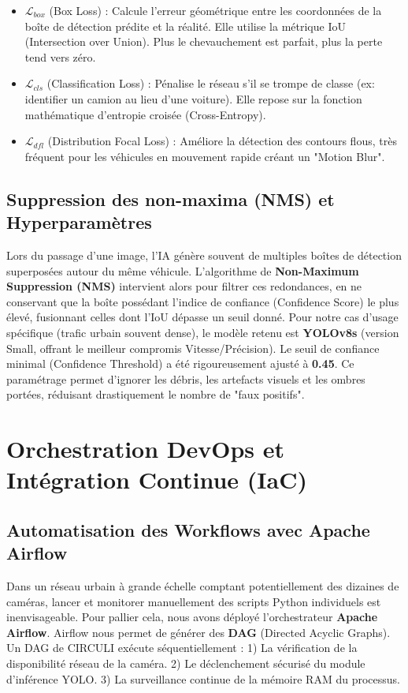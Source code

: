 \begin{itemize}
    \item \textbf{$\mathcal{L}_{box}$} (Box Loss) : Calcule l'erreur géométrique entre les coordonnées de la boîte de détection prédite et la réalité. Elle utilise la métrique IoU (Intersection over Union). Plus le chevauchement est parfait, plus la perte tend vers zéro.
    \item \textbf{$\mathcal{L}_{cls}$} (Classification Loss) : Pénalise le réseau s'il se trompe de classe (ex: identifier un camion au lieu d'une voiture). Elle repose sur la fonction mathématique d'entropie croisée (Cross-Entropy).
    \item \textbf{$\mathcal{L}_{dfl}$} (Distribution Focal Loss) : Améliore la détection des contours flous, très fréquent pour les véhicules en mouvement rapide créant un "Motion Blur".
\end{itemize}

\subsection{Suppression des non-maxima (NMS) et Hyperparamètres}
Lors du passage d'une image, l'IA génère souvent de multiples boîtes de détection superposées autour du même véhicule. L'algorithme de \textbf{Non-Maximum Suppression (NMS)} intervient alors pour filtrer ces redondances, en ne conservant que la boîte possédant l'indice de confiance (Confidence Score) le plus élevé, fusionnant celles dont l'IoU dépasse un seuil donné. 
Pour notre cas d'usage spécifique (trafic urbain souvent dense), le modèle retenu est \textbf{YOLOv8s} (version Small, offrant le meilleur compromis Vitesse/Précision). Le seuil de confiance minimal (Confidence Threshold) a été rigoureusement ajusté à \textbf{0.45}. Ce paramétrage permet d'ignorer les débris, les artefacts visuels et les ombres portées, réduisant drastiquement le nombre de "faux positifs".

\section{Orchestration DevOps et Intégration Continue (IaC)}

\subsection{Automatisation des Workflows avec Apache Airflow}
Dans un réseau urbain à grande échelle comptant potentiellement des dizaines de caméras, lancer et monitorer manuellement des scripts Python individuels est inenvisageable. Pour pallier cela, nous avons déployé l'orchestrateur \textbf{Apache Airflow}. 
Airflow nous permet de générer des \textbf{DAG} (Directed Acyclic Graphs). Un DAG de CIRCULI exécute séquentiellement : 
1) La vérification de la disponibilité réseau de la caméra. 
2) Le déclenchement sécurisé du module d'inférence YOLO. 
3) La surveillance continue de la mémoire RAM du processus.

